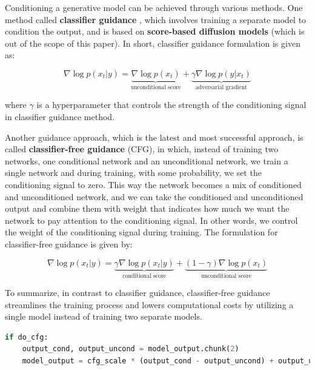 Conditioning a generative model can be achieved through various methods. One method called \textbf{classifier guidance} \cite{openai_diffusion_beats_gans} \cite{score_based_generative_modeling} \cite{openai_diffusion_beats_gans}, which involves training a separate model to condition the output, and is based on \textbf{score-based diffusion models} \cite{score_based_generative_modeling} (which is out of the scope of this paper). In short, classifier guidance formulation is given as:

\[
\nabla \log p(x_t | y) = \underbrace{\nabla \log p(x_t)}_{\text{unconditional score}} + \underbrace{\gamma \nabla \log p(y | x_t)}_{\text{adversarial gradient}}
\]

where $\gamma$ is a hyperparameter that controls the strength of the conditioning signal in classifier guidance method.

Another guidance approach, which is the latest and most successful approach, is called \textbf{classifier-free guidance} \cite{classifier_free_guidance} (CFG), in which, instead of training two networks, one conditional network and an unconditional network, we train a single network and during training, with some probability, we set the conditioning signal to zero. This way the network becomes a mix of conditioned and unconditioned network, and we can take the conditioned and unconditioned output and combine them with weight that indicates how much we want the network to pay attention to the conditioning signal. In other words, we control the weight of the conditioning signal during training. The formulation for classifier-free guidance is given by:

\[
\nabla \log p(x_t | y) = \underbrace{\gamma \nabla \log p(x_t | y)}_{\text{conditional score}} + \underbrace{(1 - \gamma) \nabla \log p(x_t)}_{\text{unconditional score}}
\]

To summarize, in contrast to classifier guidance, classifier-free guidance streamlines the training process and lowers computational costs by utilizing a single model instead of training two separate models.

\begin{lstlisting}[language=Python, caption={Classifier-free guidance (CFG) in Stable Diffusion. The CFG scale is the weight of the conditioning signal.}, label={lst:cfg_stable_diffusion}]
if do_cfg:
    output_cond, output_uncond = model_output.chunk(2)
    model_output = cfg_scale * (output_cond - output_uncond) + output_uncond
\end{lstlisting}

